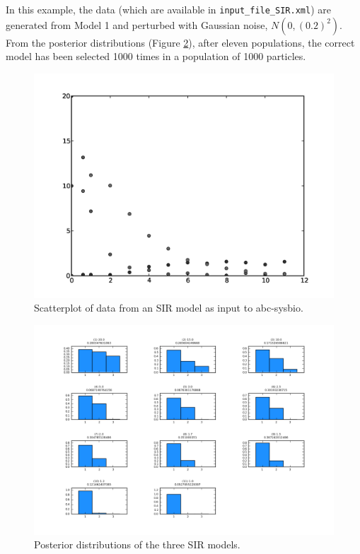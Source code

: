 \documentclass[a4paper]{report}
\begin{document}
In this example, the data (which are available in \verb$input_file_SIR.xml$) are generated from Model 1 and perturbed with Gaussian noise, $N(0, (0.2)^2)$. From the posterior distributions (Figure \ref{ModelDistributionSIR}), after eleven populations, the correct model has been selected 1000 times in a population of 1000 particles. 
\begin{figure}[htbp]
\begin{center}
\includegraphics[width=1.0\textwidth]{Graphics/dataSIR.png}
\caption{Scatterplot of data from an SIR model as input to abc-sysbio. \label{dataSIR}}
\end{center}
\end{figure}
\begin{figure}[htbp]
\begin{center}
\includegraphics[width=1.0\textwidth]{Graphics/ModelDistributionSIR.png}
\caption{Posterior distributions of the three SIR models. \label{ModelDistributionSIR}}
\end{center}
\end{figure}
\end{document}
